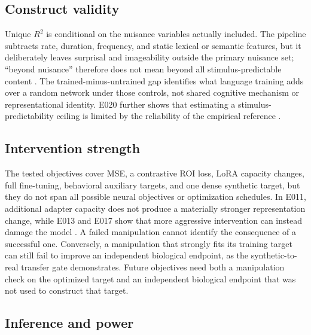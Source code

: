 \subsection{Construct validity}

Unique $R^2$ is conditional on the nuisance variables actually included.
The pipeline subtracts rate, duration, frequency, and static lexical or semantic features, but it deliberately leaves surprisal and imageability outside the primary nuisance set; ``beyond nuisance'' therefore does not mean beyond all stimulus-predictable content .
The trained-minus-untrained gap identifies what language training adds over a random network under those controls, not shared cognitive mechanism or representational identity.
E020 further shows that estimating a stimulus-predictability ceiling is limited by the reliability of the empirical reference .

\subsection{Intervention strength}

The tested objectives cover MSE, a contrastive ROI loss, LoRA capacity changes, full fine-tuning, behavioral auxiliary targets, and one dense synthetic target, but they do not span all possible neural objectives or optimization schedules.
In E011, additional adapter capacity does not produce a materially stronger representation change, while E013 and E017 show that more aggressive intervention can instead damage the model   .
A failed manipulation cannot identify the consequence of a successful one.
Conversely, a manipulation that strongly fits its training target can still fail to improve an independent biological endpoint, as the synthetic-to-real transfer gate demonstrates.
Future objectives need both a manipulation check on the optimized target and an independent biological endpoint that was not used to construct that target.

\subsection{Inference and power}

